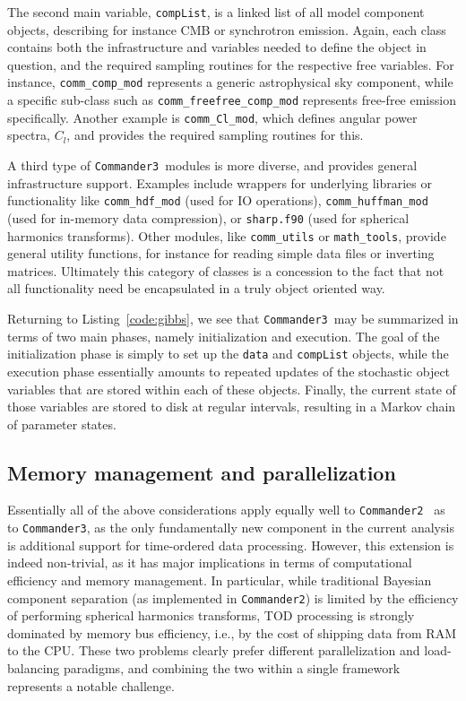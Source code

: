 \documentclass[twocolumn]{aa}
\def\commandertwo{\texttt{Commander2}}
\def\commanderthree{\texttt{Commander3}}
\begin{document}
The second main variable, \texttt{compList}, is a linked list of all
model component objects, describing for instance CMB or
synchrotron emission. Again, each class contains both the infrastructure and
variables needed to define the object in question, and the required
sampling routines for the respective free variables. For instance,
\texttt{comm\_comp\_mod} represents a generic astrophysical sky
component, while a specific sub-class such as
\texttt{comm\_freefree\_comp\_mod} represents free-free emission
specifically.  Another example is \texttt{comm\_Cl\_mod}, which
defines angular power spectra, $C_l$, and provides the required
sampling routines for this.

A third type of \commanderthree\ modules is more diverse, and provides
general infrastructure support. Examples include wrappers for
underlying libraries or functionality like \texttt{comm\_hdf\_mod}
(used for IO operations), \texttt{comm\_huffman\_mod} (used for
in-memory data compression), or \texttt{sharp.f90} (used for spherical
harmonics transforms). Other modules, like \texttt{comm\_utils} or
\texttt{math\_tools}, provide general utility functions, for instance
for reading simple data files or inverting matrices. Ultimately this
category of classes is a concession to the fact that not all
functionality need be encapsulated in a truly object oriented way. 

Returning to Listing~\ref{code:gibbs}, we see that \commanderthree\ may
be summarized in terms of two main phases, namely initialization and
execution. The goal of the initialization phase is simply to set up
the \texttt{data} and \texttt{compList} objects, while the execution
phase essentially amounts to repeated updates of the stochastic object
variables that are stored within each of these objects. Finally, the
current state of those variables are stored to disk at regular
intervals, resulting in a Markov chain of parameter states. 

\subsection{Memory management and parallelization}
\label{sec:memory}

Essentially all of the above considerations apply equally well to
\commandertwo\ \citep{seljebotn:2019} as to \commanderthree, as the
only fundamentally new component in the current analysis is additional
support for time-ordered data processing. However, this extension is
indeed non-trivial, as it has major implications in terms of
computational efficiency and memory management. In particular, while
traditional Bayesian component separation (as implemented in
\commandertwo) is limited by the efficiency of performing spherical
harmonics transforms, TOD processing is strongly dominated by memory
bus efficiency, i.e., by the cost of shipping data from RAM to the
CPU. These two problems clearly prefer different parallelization and
load-balancing paradigms, and combining the two within a single
framework represents a notable challenge.
\end{document}
